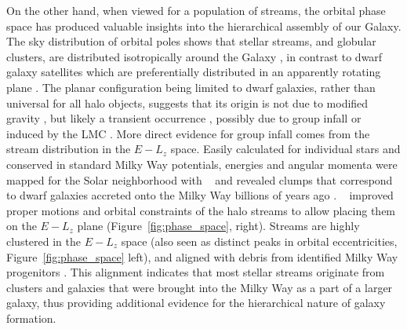 \documentclass[final,5p,times,twocolumn,authoryear]{elsarticle}
\begin{document}
On the other hand, when viewed for a population of streams, the orbital phase space has produced valuable insights into the hierarchical assembly of our Galaxy.
The sky distribution of orbital poles shows that stellar streams, and globular clusters, are distributed isotropically around the Galaxy \citep{riley:2020, vasiliev:2019b}, in contrast to dwarf galaxy satellites which are preferentially distributed in an apparently rotating plane \citep[e.g.,][]{pawlowski:2012, pawlowski:2020, fritz:2018}.
The planar configuration being limited to dwarf galaxies, rather than universal for all halo objects, suggests that its origin is not due to modified gravity \citep[e.g.,][]{pawlowski:2018}, but likely a transient occurrence \citep{sawala:2023, xu:2023}, possibly due to group infall \citep{patel:2020} or induced by the LMC \citep{garavito-camargo:2021,garavito-camargo:2024}.
More direct evidence for group infall comes from the stream distribution in the $E-L_z$ space.
Easily calculated for individual stars and conserved in standard Milky Way potentials, energies and angular momenta were mapped for the Solar neighborhood with \gaia~ and revealed clumps that correspond to dwarf galaxies accreted onto the Milky Way billions of years ago \citep[e.g.,][]{helmi:2018,belokurov:2018,myeong:2019}.
\gaia~ improved proper motions and orbital constraints of the halo streams to allow placing them on the $E-L_z$ plane (Figure~\ref{fig:phase_space}, right).
Streams are highly clustered in the $E-L_z$ space (also seen as distinct peaks in orbital eccentricities, Figure~\ref{fig:phase_space} left), and aligned with debris from identified Milky Way progenitors \citep{bonaca:2021,malhan:2022}.
This alignment indicates that most stellar streams originate from clusters and galaxies that were brought into the Milky Way as a part of a larger galaxy, thus providing additional evidence for the hierarchical nature of galaxy formation.
\end{document}
